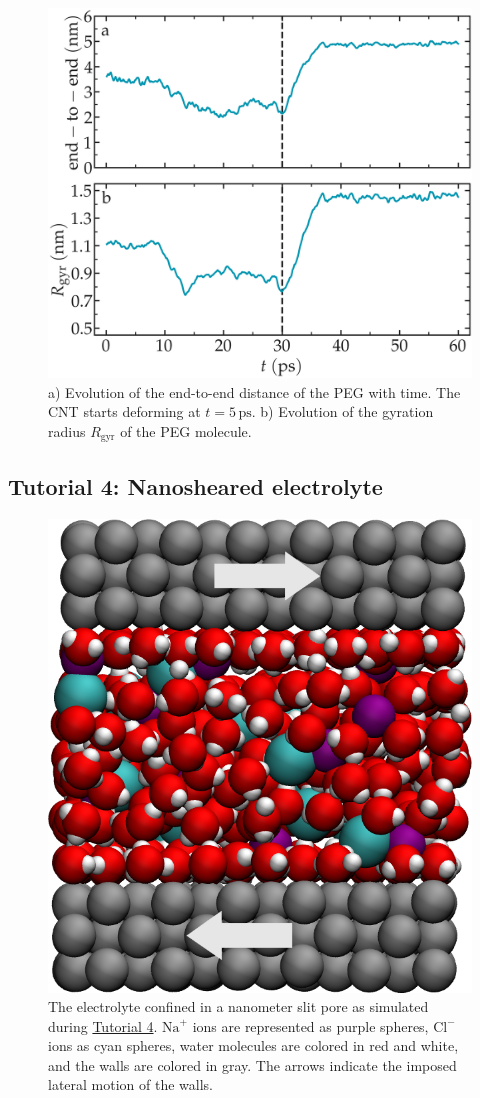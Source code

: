 \documentclass[9pt,tutorial]{livecoms}
\begin{document}
\begin{figure}
\centering
\includegraphics[width=\linewidth]{PEG-distance}
\caption{a) Evolution of the end-to-end distance of the PEG with time. The CNT starts deforming at $t = 5\,\text{ps}$. b) Evolution of the gyration radius $R_\text{gyr}$ of the PEG molecule.}
\label{fig:PEG-distance}
\end{figure}

\subsection{Tutorial 4: Nanosheared electrolyte}
\label{sheared-confined-label}

\begin{figure}
\centering
\includegraphics[width=0.55\linewidth]{NANOSHEAR}
\caption{The electrolyte confined in a nanometer slit pore as simulated during \hyperref[sheared-confined-label]{Tutorial 4}. $\text{Na}^+$ ions are represented as purple spheres, $\text{Cl}^-$ ions as cyan spheres, water molecules are colored in red and white, and the walls are colored in gray. The arrows indicate the imposed lateral motion of the walls.}
\label{fig:NANOSHEAR}
\end{figure}
\end{document}
